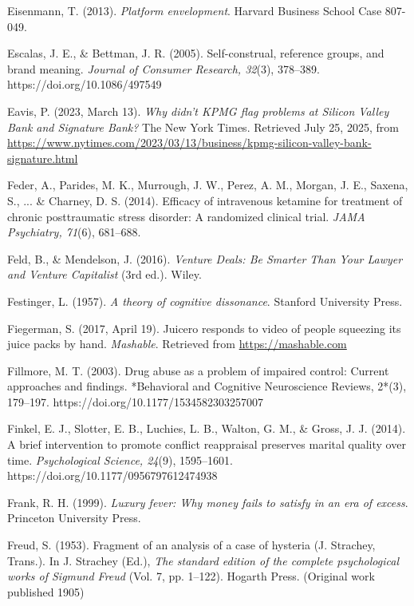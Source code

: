 \begin{thebibliography}{}
    Eisenmann, T. (2013). \textit{Platform envelopment}. Harvard Business School Case 807-049.

    Escalas, J. E., \& Bettman, J. R. (2005). Self-construal, reference groups, and brand meaning. \textit{Journal of Consumer Research, 32}(3), 378--389. https://doi.org/10.1086/497549

    Eavis, P. (2023, March 13). \textit{Why didn’t KPMG flag problems at Silicon Valley Bank and Signature Bank?} The New York Times. Retrieved July 25, 2025, from \url{https://www.nytimes.com/2023/03/13/business/kpmg-silicon-valley-bank-signature.html}


    Feder, A., Parides, M. K., Murrough, J. W., Perez, A. M., Morgan, J. E., Saxena, S., ... \& Charney, D. S. (2014). Efficacy of intravenous ketamine for treatment of chronic posttraumatic stress disorder: A randomized clinical trial. \textit{JAMA Psychiatry, 71}(6), 681–688.

    Feld, B., \& Mendelson, J. (2016). \textit{Venture Deals: Be Smarter Than Your Lawyer and Venture Capitalist} (3rd ed.). Wiley.
    
    Festinger, L. (1957). \textit{A theory of cognitive dissonance}. Stanford University Press.

    Fiegerman, S. (2017, April 19). Juicero responds to video of people squeezing its juice packs by hand. \textit{Mashable}. Retrieved from \url{https://mashable.com}

    Fillmore, M. T. (2003). Drug abuse as a problem of impaired control: Current approaches and findings. *Behavioral and Cognitive Neuroscience Reviews, 2*(3), 179–197. https://doi.org/10.1177/1534582303257007

    Finkel, E. J., Slotter, E. B., Luchies, L. B., Walton, G. M., \& Gross, J. J. (2014). A brief intervention to promote conflict reappraisal preserves marital quality over time. \textit{Psychological Science, 24}(9), 1595–1601. https://doi.org/10.1177/0956797612474938

    Frank, R. H. (1999). \textit{Luxury fever: Why money fails to satisfy in an era of excess}. Princeton University Press.

    Freud, S. (1953). Fragment of an analysis of a case of hysteria (J. Strachey, Trans.). In J. Strachey (Ed.), \textit{The standard edition of the complete psychological works of Sigmund Freud} (Vol. 7, pp. 1–122). Hogarth Press. (Original work published 1905)


\end{thebibliography}
